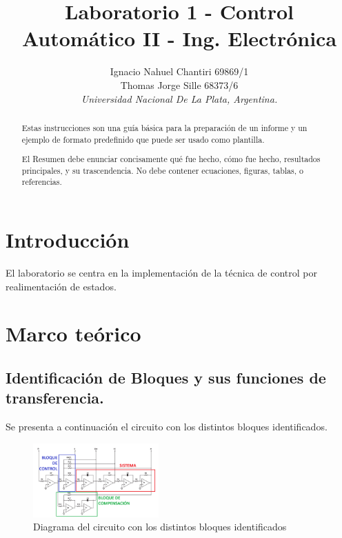 \documentclass[letterpaper, 10 pt, conference]{ieeeconf}  %
\title{\LARGE \bf
Laboratorio 1 - Control Automático II - Ing. Electrónica
}
\author{Ignacio Nahuel Chantiri 69869/1 \\ Thomas Jorge Sille 68373/6\\ %
{\it Universidad Nacional De La Plata, Argentina.}}                              %
\begin{document}
\maketitle
\thispagestyle{empty}
\pagestyle{empty}


\begin{abstract}

Estas instrucciones son una guía b\'asica para la preparaci\'on de un informe y un ejemplo de formato predefinido que puede ser usado como plantilla.

El Resumen debe enunciar concisamente qu\'e fue hecho, c\'omo fue hecho, resultados principales, y su trascendencia. No debe contener ecuaciones, figuras, tablas, o referencias. 


\end{abstract}


\section{Introducci\'on}

El laboratorio se centra en la implementación de la técnica de control por realimentación de estados.


\section{Marco teórico}


\subsection{Identificación de Bloques y sus funciones de transferencia.}
Se presenta a continuación el circuito con los distintos bloques identificados.

\begin{figure}[H]
  \centering
  \includegraphics[width=0.43\textwidth]{IDENTIFICACION DE VLOQUES.png}
  \caption{Diagrama del circuito con los distintos bloques identificados}
  \label{fig:diag_elect_esq}
\end{figure}
\end{document}
